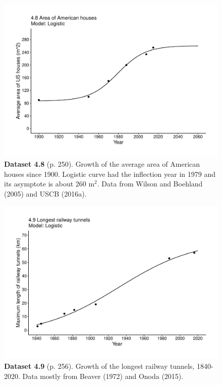 \documentclass[aps,rmp,preprint,superscriptaddress,10pt,onecolumn]{article}
\begin{document}
\clearpage
\begin{figure}[h]
\includegraphics[width=\textwidth]{output/figs-ggplot/4.8.pdf}
\caption*{\textbf{Dataset 4.8} (p. 250). Growth of the average area of American houses since 1900. Logistic curve had the inflection year in 1979 and its asymptote is about 260 m$^2$. Data from Wilson and Boehland (2005) and USCB (2016a).}
\end{figure}
	
\clearpage
\begin{figure}[h]
\includegraphics[width=\textwidth]{output/figs-ggplot/4.9.pdf}
\caption*{\textbf{Dataset 4.9} (p. 256). Growth of the longest railway tunnels, 1840-2020. Data mostly from Beaver (1972) and Onoda (2015).}
\end{figure}
	
\end{document}
